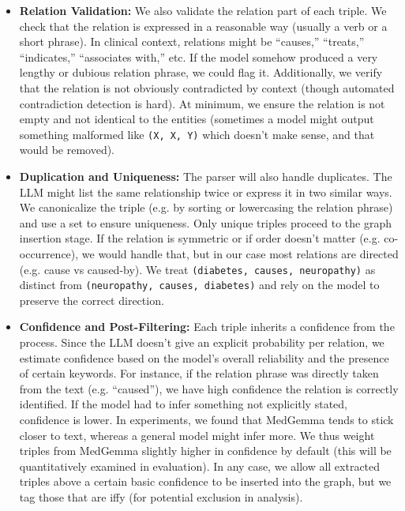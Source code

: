 \begin{itemize}
\item \textbf{Relation Validation:} We also validate the relation part of each triple. We check that the relation is expressed in a reasonable way (usually a verb or a short phrase). In clinical context, relations might be ``causes,'' ``treats,'' ``indicates,'' ``associates with,'' etc. If the model somehow produced a very lengthy or dubious relation phrase, we could flag it. Additionally, we verify that the relation is not obviously contradicted by context (though automated contradiction detection is hard). At minimum, we ensure the relation is not empty and not identical to the entities (sometimes a model might output something malformed like \texttt{(X, X, Y)} which doesn't make sense, and that would be removed).

\item \textbf{Duplication and Uniqueness:} The parser will also handle duplicates. The LLM might list the same relationship twice or express it in two similar ways. We canonicalize the triple (e.g. by sorting or lowercasing the relation phrase) and use a set to ensure uniqueness. Only unique triples proceed to the graph insertion stage. If the relation is symmetric or if order doesn't matter (e.g. co-occurrence), we would handle that, but in our case most relations are directed (e.g. cause vs caused-by). We treat \texttt{(diabetes, causes, neuropathy)} as distinct from \texttt{(neuropathy, causes, diabetes)} and rely on the model to preserve the correct direction.

\item \textbf{Confidence and Post-Filtering:} Each triple inherits a confidence from the process. Since the LLM doesn't give an explicit probability per relation, we estimate confidence based on the model's overall reliability and the presence of certain keywords. For instance, if the relation phrase was directly taken from the text (e.g. ``caused''), we have high confidence the relation is correctly identified. If the model had to infer something not explicitly stated, confidence is lower. In experiments, we found that MedGemma tends to stick closer to text, whereas a general model might infer more. We thus weight triples from MedGemma slightly higher in confidence by default (this will be quantitatively examined in evaluation). In any case, we allow all extracted triples above a certain basic confidence to be inserted into the graph, but we tag those that are iffy (for potential exclusion in analysis).
\end{itemize}

